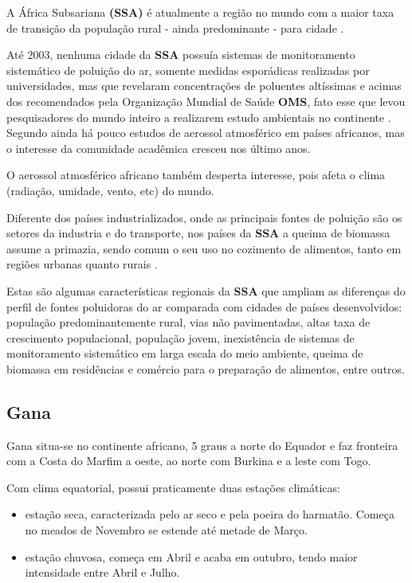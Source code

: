 A África Subsariana \textbf{(SSA)} é atualmente a região no mundo com a maior 
taxa de transição da população rural - ainda predominante - para cidade
\citep{MONTGOMERY2008}. 

Até 2003, nenhuma cidade da \textbf{SSA} possuía sistemas de monitoramento 
sistemático de poluição do ar, somente medidas esporádicas realizadas
por universidades, mas que revelaram concentrações de poluentes altíssimas e 
acimas dos recomendados pela Organização Mundial de Saúde \textbf{OMS},
fato esse que levou pesquisadores do mundo inteiro a 
realizarem estudo ambientais no continente \citep{EZZATI2004}. 
Segundo \cite{aboh2009} ainda há pouco estudos de aerossol atmosférico 
em países africanos, mas o interesse da comunidade acadêmica cresceu
nos último anos.
 
O aerossol atmosférico africano também desperta interesse, pois afeta o clima 
(radiação, umidade, vento, etc) do mundo.

Diferente dos países industrializados, onde as principais fontes de poluição 
são os setores da industria e do transporte, nos países da \textbf{SSA} a 
queima de biomassa assume a primazia, sendo comum o seu uso no cozimento 
de alimentos, tanto em regiões urbanas quanto rurais \citep{SMITH2004}. 

Estas são algumas características regionais da \textbf{SSA} que ampliam as 
diferenças do perfil de fontes poluidoras do ar comparada com cidades 
de países desenvolvidos: população predominantemente rural,
vias não pavimentadas, altas taxa de crescimento populacional, população jovem,
inexistência de sistemas de monitoramento sistemático em larga escala do meio 
ambiente, queima de biomassa em residências e comércio para o preparação
de alimentos, entre outros. 

\subsection{Gana}

Gana situa-se no continente africano, 5 graus a norte do Equador e 
faz fronteira com a Costa do Marfim a oeste, ao norte com Burkina
e a leste com Togo. 

Com clima equatorial, possui praticamente duas estações climáticas:

\begin{itemize}
  \item estação seca, caracterizada pelo ar seco e pela poeira do harmatão. 
       Começa no meados de Novembro se estende até metade de Março.
 \item estação chuvosa, começa em Abril e acaba em outubro, tendo maior
       intensidade entre Abril e Julho.
\end{itemize}

